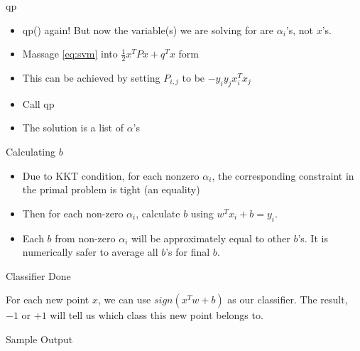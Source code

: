 \documentclass[12pt,fleqn]{article}\usepackage{../common}
\begin{document}
qp

\begin{itemize}
   \item qp() again! But now the variable(s) we are solving for are
     $\alpha_i$'s, not $x$'s. 
   \item Massage \ref{eq:svm} into  $\frac{1}{2}x^{T}Px+q^{T}x$ form
   \item This can be achieved by setting $P_{i,j}$ to be $-y_{i}y_{j}x_{i}^{T}x_{j}$
   \item Call qp
   \item The solution is a list of $\alpha$'s 
\end{itemize}

Calculating $b$

\begin{itemize}
   \item Due to KKT condition, for each nonzero $\alpha_{i}$, the corresponding
   constraint in the primal problem is tight (an equality)
   \item Then for each non-zero $\alpha_{i}$, calculate $b$ using $w^{T}x_{i}+b = y_{i}$.
   \item Each $b$ from non-zero $\alpha_{i}$ will be approximately equal to
   other $b$'s. It is numerically safer to average all $b$'s for final $b$.
\end{itemize}

Classifier Done

For each new point $x$, we can use $sign(x^{T}w+b)$ as our classifier. The
result, $-1$ or $+1$ will tell us which class this new point belongs to.

Sample Output

\begin{figure}[!hbp]
\caption{}
\end{figure}
\end{document}
